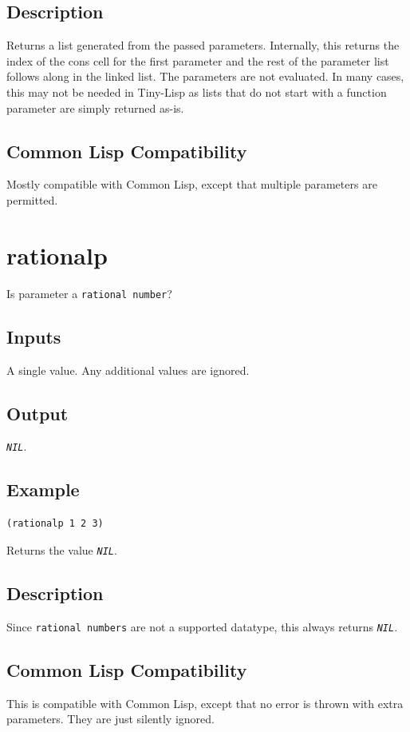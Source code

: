 \documentclass[10pt, openany]{book}
\newcommand{\constant}[1]{\emph{\texttt{#1}}}
\newcommand{\datatype}[1]{\texttt{#1}}
\newcommand{\tl}{Tiny-Lisp}
\newcommand{\cl}{Common Lisp}
\begin{document}
\subsection{Description}
Returns a list generated from the passed parameters.  Internally, this returns the index of the cons cell for the first parameter and the rest of the parameter list follows along in the linked list.  The parameters are not evaluated.  In many cases, this may not be needed in \tl{} as lists that do not start with a function parameter are simply returned as-is.
\subsection{Common Lisp Compatibility}
Mostly compatible with \cl, except that multiple parameters are permitted.

\section{rationalp}
Is parameter a \datatype{rational number}?
\subsection{Inputs}
A single value.  Any additional values are ignored.
\subsection{Output}
\constant{NIL}.
\subsection{Example}
\begin{lstlisting}
(rationalp 1 2 3)
\end{lstlisting}
Returns the value \constant{NIL}.
\subsection{Description}
Since \datatype{rational numbers} are not a supported datatype, this always returns \constant{NIL}.
\subsection{Common Lisp Compatibility}
This is compatible with \cl, except that no error is thrown with extra parameters.  They are just silently ignored.
\end{document}
